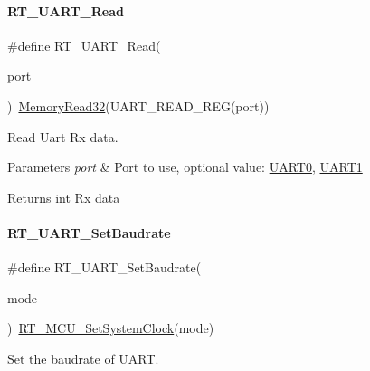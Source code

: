 \paragraph{\texorpdfstring{R\+T\+\_\+\+U\+A\+R\+T\+\_\+\+Read}{RT\_UART\_Read}}
{\footnotesize\ttfamily \#define R\+T\+\_\+\+U\+A\+R\+T\+\_\+\+Read(\begin{DoxyParamCaption}\item[{}]{port }\end{DoxyParamCaption})~\mbox{\hyperlink{a00020_a2d484dc15bdf30ee11ab3b05f31f0e16}{Memory\+Read32}}(U\+A\+R\+T\+\_\+\+R\+E\+A\+D\+\_\+\+R\+EG(port))}



Read Uart Rx data. 


\begin{DoxyParams}{Parameters}
{\em port} & Port to use, optional value\+: \mbox{\hyperlink{a00056_a0508661f121639ffdee7de2353a0def2}{U\+A\+R\+T0}}, \mbox{\hyperlink{a00056_a8d69bf04d07af4fbbab5a8bd291f65ff}{U\+A\+R\+T1}} \\
\hline
\end{DoxyParams}
\begin{DoxyReturn}{Returns}
int Rx data 
\end{DoxyReturn}
\mbox{\label{a00056_a565befb27caf782083358e0ad81af3a3}} 
\paragraph{\texorpdfstring{R\+T\+\_\+\+U\+A\+R\+T\+\_\+\+Set\+Baudrate}{RT\_UART\_SetBaudrate}}
{\footnotesize\ttfamily \#define R\+T\+\_\+\+U\+A\+R\+T\+\_\+\+Set\+Baudrate(\begin{DoxyParamCaption}\item[{}]{mode }\end{DoxyParamCaption})~\mbox{\hyperlink{a00020_a017f8665ec51267680fc0e536db19c13}{R\+T\+\_\+\+M\+C\+U\+\_\+\+Set\+System\+Clock}}(mode)}



Set the baudrate of U\+A\+RT. 


